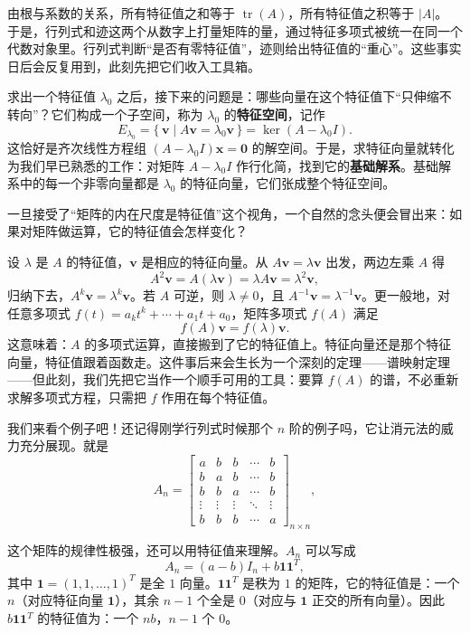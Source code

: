 \documentclass[UTF8]{ctexbook}
\begin{document}
由根与系数的关系，所有特征值之和等于 $\operatorname{tr}(A)$，所有特征值之积等于 $|A|$。
于是，行列式和迹这两个从数字上打量矩阵的量，通过特征多项式被统一在同一个代数对象里。行列式判断“是否有零特征值”，迹则给出特征值的“重心”。这些事实日后会反复用到，此刻先把它们收入工具箱。

求出一个特征值 $\lambda_0$ 之后，接下来的问题是：哪些向量在这个特征值下“只伸缩不转向”？它们构成一个子空间，称为 $\lambda_0$ 的\textbf{特征空间}，记作
\[
E_{\lambda_0}=\{\,\mathbf{v}\mid A\mathbf{v}=\lambda_0\mathbf{v}\,\}=\ker(A-\lambda_0 I).
\]
这恰好是齐次线性方程组 $(A-\lambda_0 I)\mathbf{x}=\mathbf{0}$ 的解空间。于是，求特征向量就转化为我们早已熟悉的工作：对矩阵 $A-\lambda_0 I$ 作行化简，找到它的\textbf{基础解系}。基础解系中的每一个非零向量都是 $\lambda_0$ 的特征向量，它们张成整个特征空间。


一旦接受了“矩阵的内在尺度是特征值”这个视角，一个自然的念头便会冒出来：如果对矩阵做运算，它的特征值会怎样变化？

设 $\lambda$ 是 $A$ 的特征值，$\mathbf{v}$ 是相应的特征向量。从 $A\mathbf{v}=\lambda\mathbf{v}$ 出发，两边左乘 $A$ 得
\[
A^2\mathbf{v}=A(\lambda\mathbf{v})=\lambda A\mathbf{v}=\lambda^2\mathbf{v},
\]
归纳下去，$A^k\mathbf{v}=\lambda^k\mathbf{v}$。若 $A$ 可逆，则 $\lambda\neq0$，且 $A^{-1}\mathbf{v}=\lambda^{-1}\mathbf{v}$。更一般地，对任意多项式 $f(t)=a_kt^k+\cdots+a_1t+a_0$，矩阵多项式 $f(A)$ 满足
\[
f(A)\mathbf{v}=f(\lambda)\mathbf{v}.
\]
这意味着：$A$ 的多项式运算，直接搬到了它的特征值上。特征向量还是那个特征向量，特征值跟着函数走。这件事后来会生长为一个深刻的定理——谱映射定理——但此刻，我们先把它当作一个顺手可用的工具：要算 $f(A)$ 的谱，不必重新求解多项式方程，只需把 $f$ 作用在每个特征值。

我们来看个例子吧！还记得刚学行列式时候那个 $n$ 阶的例子吗，它让消元法的威力充分展现。就是
\[
A_n=\begin{bmatrix}
a & b & b & \cdots & b\\
b & a & b & \cdots & b\\
b & b & a & \cdots & b\\
\vdots & \vdots & \vdots & \ddots & \vdots\\
b & b & b & \cdots & a
\end{bmatrix}_{n\times n},
\]

这个矩阵的规律性极强，还可以用特征值来理解。$A_n$ 可以写成
\[
A_n=(a-b)I_n+b\mathbf{1}\mathbf{1}^T,
\]
其中 $\mathbf{1}=(1,1,\dots,1)^T$ 是全 $1$ 向量。$\mathbf{1}\mathbf{1}^T$ 是秩为 $1$ 的矩阵，它的特征值是：一个 $n$（对应特征向量 $\mathbf{1}$），其余 $n-1$ 个全是 $0$（对应与 $\mathbf{1}$ 正交的所有向量）。因此 $b\mathbf{1}\mathbf{1}^T$ 的特征值为：一个 $nb$，$n-1$ 个 $0$。
\end{document}

